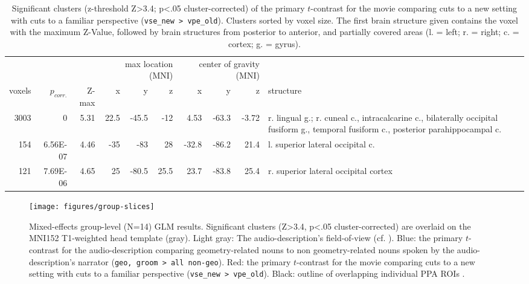 \documentclass[english]{article}
\begin{document}
\begin{table}[t]
    \caption{Significant clusters (z-threshold Z>3.4; p<.05 cluster-corrected)
        of the primary $t$-contrast for the movie comparing cuts to a new
        setting with cuts to a familiar perspective (\texttt{vse\_new >
        vpe\_old}).
Clusters sorted by voxel size.
The first brain structure given contains the voxel with the maximum Z-Value,
followed by brain structures from posterior to anterior, and partially covered
areas (l. = left; r. = right; c. = cortex; g. = gyrus).}
\label{tab:res-av-group1}
\begin{tabular}{rrrrrrrrrp{3cm}}
\toprule
& & & \multicolumn{3}{r}{max location (MNI)} & \multicolumn{3}{r}{center of gravity (MNI)} &
\\ \cmidrule{4-6} \cmidrule{7-9}
voxels & $p_{corr.}$ & Z-max & x & y & z  & x & y & z & structure \\
\midrule
3003 & 0 & 5.31 & 22.5 & -45.5 & -12 & 4.53 & -63.3 & -3.72 & r. lingual g.; r. cuneal c., intracalcarine c., bilaterally occipital fusiform g., temporal fusiform c., posterior parahippocampal c.  \\
154 & 6.56E-07 & 4.46 & -35 & -83 & 28 & -32.8 & -86.2 & 21.4 & l. superior lateral occipital c. \\
121 & 7.69E-06 & 4.65 & 25 & -80.5 & 25.5 & 23.7 & -83.8 & 25.4 & r. superior lateral occipital cortex \\
\bottomrule
\end{tabular}
\end{table}


\begin{figure} \centering
    \texttt{[image: figures/group-slices]}
    \caption{Mixed-effects group-level (N=14) GLM results. Significant clusters
        (Z>3.4, p<.05 cluster-corrected) are overlaid on the MNI152 T1-weighted
        head template (gray).
        Light gray: The audio-description's field-of-view
        (cf. \citep{hanke2014audiomovie}).
        Blue: the primary $t$-contrast for the audio-description comparing
        geometry-related nouns to non geometry-related nouns spoken by the
        audio-description's narrator (\texttt{geo, groom > all non-geo}).
        Red: the primary $t$-contrast for the movie comparing cuts to a new
        setting with cuts to a familiar perspective (\texttt{vse\_new >
        vpe\_old}).
        Black: outline of overlapping individual PPA ROIs      \citep{sengupta2016extension}.}
    \label{fig:group-slices}
\end{figure}
\end{document}
